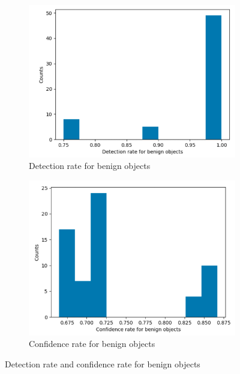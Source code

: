 \begin{figure}
	\centering
	\begin{subfigure}{0.5\textwidth}
		\centering
		\includegraphics[width=0.7\linewidth]{figure/detection-rate-b.png}
		\caption{Detection rate for benign objects}
		\label{fig:det-b}
	\end{subfigure}%
	\begin{subfigure}{0.5\textwidth}
		\centering
		\includegraphics[width=0.7\linewidth]{figure/conf-rate-b.png}
		\caption{Confidence rate for benign objects}
		\label{fig:conf-b}
	\end{subfigure}
	\caption{Detection rate and confidence rate for benign objects}
	\label{fig:swat}
\end{figure}

